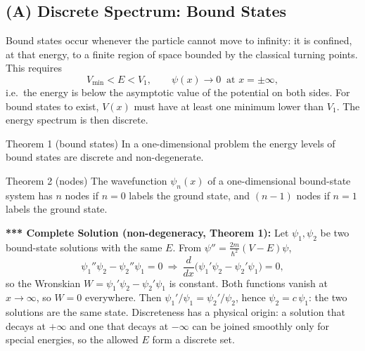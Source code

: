 \documentclass[11pt,a4paper]{article}
\begin{document}
\begin{center}
\end{center}

\subsection{(A) Discrete Spectrum: Bound States}
Bound states occur whenever the particle cannot move to infinity: it is confined, at that energy, to a finite region of space bounded by the classical turning points. This requires
\[
V_{\min}<E<V_1,\qquad \psi(x)\to0\ \text{ at }x=\pm\infty,
\]
i.e.\ the energy is below the asymptotic value of the potential on both sides. For bound states to exist, $V(x)$ must have at least one minimum lower than $V_1$. The energy spectrum is then discrete.

\begin{thm}{Theorem 1 (bound states)}
In a one-dimensional problem the energy levels of bound states are discrete and non-degenerate.
\end{thm}
\begin{thm}{Theorem 2 (nodes)}
The wavefunction $\psi_n(x)$ of a one-dimensional bound-state system has $n$ nodes if $n=0$ labels the ground state, and $(n-1)$ nodes if $n=1$ labels the ground state.
\end{thm}
\textbf{*** Complete Solution (non-degeneracy, Theorem 1):} Let $\psi_1,\psi_2$ be two bound-state solutions with the same $E$. From $\psi''=\frac{2m}{\hbar^2}(V-E)\psi$,
\[
\psi_1''\psi_2-\psi_2''\psi_1=0\ \Longrightarrow\ \frac d{dx}\big(\psi_1'\psi_2-\psi_2'\psi_1\big)=0 ,
\]
so the Wronskian $W=\psi_1'\psi_2-\psi_2'\psi_1$ is constant. Both functions vanish at $x\to\infty$, so $W=0$ everywhere. Then $\psi_1'/\psi_1=\psi_2'/\psi_2$, hence $\psi_2=c\,\psi_1$: the two solutions are the same state. Discreteness has a physical origin: a solution that decays at $+\infty$ and one that decays at $-\infty$ can be joined smoothly only for special energies, so the allowed $E$ form a discrete set.
\end{document}
